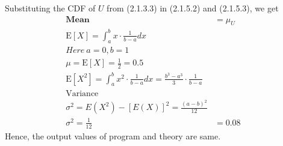 \begin{enumerate}
Substituting the CDF of $U$ from (2.1.3.3) in (2.1.5.2) and (2.1.5.3), we get \\
 \begin{align}
	\label{eq:mean_uni}
	\textbf{Mean} & =\mu_U & \\
 \mathrm{E}[X]=\int_a^b x \cdot \frac{1}{b-a} d x
 \\ Here \  a=0,b=1
 \\ \mu= \mathrm{E}[X]= \frac{1}{2} = 0.5	\\
	\label{eq:var_uni}
	\mathrm{E}[X^2]=\int_a^b x^2 \cdot \frac{1}{b-a} d x=\frac{b^3-a^3}{3} \cdot \frac{1}{b-a} \\
 \text{Variance} \\
 \sigma^2=E\left(X^2\right)-[E(X)]^2
 =\frac{(a-b)^2}{12}\\
  \sigma^2 = \frac{1}{12} & = 0.08
\end{align} 
Hence, the output values of program and theory are same.
\end{enumerate}
